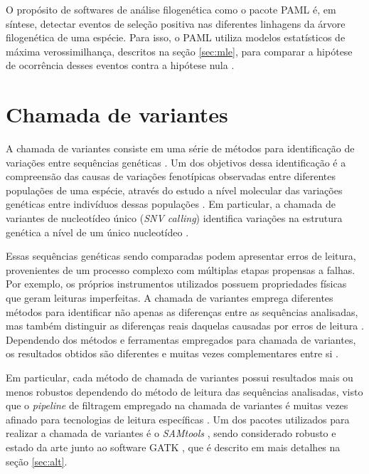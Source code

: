 \documentclass[cic,tc]{iiufrgs}
\begin{document}
O propósito de softwares de análise filogenética como o pacote PAML é, em
síntese, detectar eventos de seleção positiva nas diferentes linhagens da
árvore filogenética de uma espécie. Para isso, o PAML utiliza modelos
estatísticos de máxima verossimilhança, descritos na seção \ref{sec:mle}, para
comparar a hipótese de ocorrência desses eventos contra a hipótese nula
\cite{moretti2012gcodeml}.

\section{Chamada de variantes}
\label{sec:call}

A chamada de variantes consiste em uma série de métodos para identificação de
variações entre sequências genéticas \cite{nielsen2011genotype}. Um dos
objetivos dessa identificação é a compreensão das causas de variações
fenotípicas observadas entre diferentes populações de uma espécie, através do
estudo a nível molecular das variações genéticas entre indivíduos dessas
populações \cite{jiang2019population}. Em particular, a chamada de variantes de
nucleotídeo único (\textit{SNV calling}) identifica variações na estrutura
genética a nível de um único nucleotídeo \cite{khurana2016role}.

Essas sequências genéticas sendo comparadas podem apresentar erros de leitura,
provenientes de um processo complexo com múltiplas etapas propensas a falhas.
Por exemplo, os próprios instrumentos utilizados possuem propriedades físicas
que geram leituras imperfeitas. A chamada de variantes emprega diferentes
métodos para identificar não apenas as diferenças entre as sequências
analisadas, mas também distinguir as diferenças reais daquelas causadas por
erros de leitura \cite{poplin2018universal}. Dependendo dos métodos e
ferramentas empregados para chamada de variantes, os resultados obtidos são
diferentes e muitas vezes complementares entre
si \cite{hwang2015systematic} \cite{gezsi2015variantmetacaller} \cite{guo2015seqmule}.

Em particular, cada método de chamada de variantes possui resultados mais ou
menos robustos dependendo do método de leitura das sequências analisadas, visto
que o \textit{pipeline} de filtragem empregado na chamada de variantes é muitas vezes
afinado para tecnologias de leitura específicas \cite{poplin2018universal}. Um
dos pacotes utilizados para realizar a chamada de variantes é o
\textit{SAMtools} \cite{pirooznia2014validation}, sendo considerado robusto e estado da
arte junto ao software
GATK \cite{crysnanto2019accurate} \cite{hwang2015systematic}
\cite{yao2020evaluation} \cite{poplin2018universal}, que é descrito em mais
detalhes na seção \ref{sec:alt}.
\end{document}
